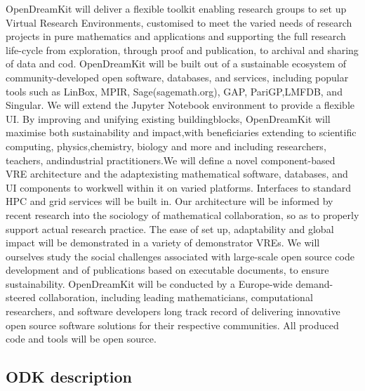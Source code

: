 \documentclass[12pta4wide]{amsart}
\begin{document}
OpenDreamKit will deliver a flexible toolkit enabling research groups to set up Virtual Research Environments,
customised to meet the varied needs of research projects in pure mathematics and applications and supporting
the full research life-cycle from exploration, through proof and publication, to archival and sharing of data and
cod. OpenDreamKit will be built out of a sustainable ecosystem of community-developed open software, databases,
and services, including popular tools such as LinBox, MPIR, Sage(sagemath.org), GAP, PariGP,LMFDB, and
Singular. We will extend the Jupyter Notebook environment to provide a flexible UI. By improving and unifying
existing buildingblocks, OpenDreamKit will maximise both sustainability and impact,with beneficiaries extending
to scientific computing, physics,chemistry, biology and more and including researchers, teachers, andindustrial
practitioners.We will define a novel component-based VRE architecture and the adaptexisting mathematical software,
databases, and UI components to workwell within it on varied platforms. Interfaces to standard HPC and  grid
services will be built in. Our architecture will be informed by recent research into the sociology of mathematical
collaboration, so as to properly support actual research practice. The ease of set up, adaptability and global impact
will be demonstrated in a variety of demonstrator VREs. We will ourselves study the social challenges associated
with large-scale open source code development and of publications based on executable documents, to ensure
sustainability. OpenDreamKit will be conducted by a Europe-wide demand-steered collaboration, including leading
mathematicians, computational researchers, and software developers long track record of delivering innovative open
source software solutions for their respective communities. All produced code and tools will be open source.

\subsection{ODK description}
\end{document}
